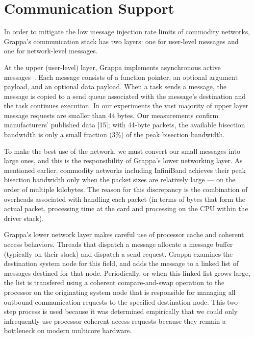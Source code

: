 \section{Communication Support}
\label{sec:communication}

In order to mitigate the low message injection rate limits of commodity networks, Grappa's communication stack has two layers: one for user-level messages and one for network-level messages.

At the upper (user-level) layer, Grappa implements asynchronous active messages~\cite{vonEicken92}. Each message consists of a function pointer, an optional argument payload, and an optional data payload. When a task sends a message, the message is copied to a send queue associated with the message's destination and the task continues execution.  In our experiments the vast majority of upper layer message requests are smaller than 44 bytes. Our measurements confirm manufacturers' published data [15]; with 44-byte packets, the available bisection bandwidth is only a small fraction (3\%) of the peak bisection bandwidth.

To make the best use of the network, we must convert our small messages into large ones, and this is the responsibility of Grappa’s lower networking layer. As mentioned earlier, commodity networks including InfiniBand achieves their peak bisection bandwidth only when the packet sizes are relatively large --- on the order of multiple kilobytes. The reason for this discrepancy is the combination of overheads associated with handling each packet (in terms of bytes that form the actual packet, processing time at the card and processing on the CPU within the driver stack).

Grappa's lower network layer makes careful use of processor cache and coherent access behaviors.  Threads that dispatch a message allocate a message buffer (typically on their stack) and dispatch a send request.  Grappa examines the destination system node for this field, and adds the message to a linked list of messages destined for that node.  Periodically, or when this linked list grows large, the list is transfered using a coherent compare-and-swap operation to the processor on the originating system node that is responsible for managing all outbound communication requests to the specified destination node.  This two-step process is used because it was determined empirically that we could only infrequently use processor coherent access requests because they remain a bottleneck on modern multicore hardware.

